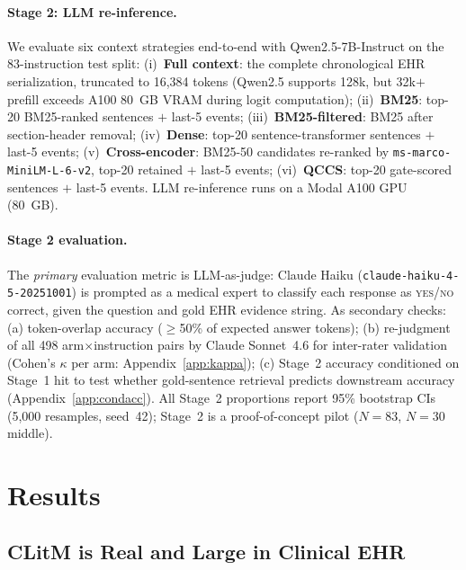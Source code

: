 \documentclass{article}
\begin{document}
\paragraph{Stage 2: LLM re-inference.} We evaluate six context strategies
end-to-end with Qwen2.5-7B-Instruct on the 83-instruction test split:
(i)~\textbf{Full context}: the complete chronological EHR serialization, truncated to
16,384 tokens (Qwen2.5 supports 128k, but 32k$+$ prefill exceeds A100 80~GB
VRAM during logit computation); (ii)~\textbf{BM25}: top-20 BM25-ranked
sentences $+$ last-5 events; (iii)~\textbf{BM25-filtered}: BM25 after
section-header removal; (iv)~\textbf{Dense}: top-20 sentence-transformer
sentences $+$ last-5 events; (v)~\textbf{Cross-encoder}: BM25-50 candidates
re-ranked by \texttt{ms-marco-MiniLM-L-6-v2}, top-20 retained $+$ last-5 events;
(vi)~\textbf{QCCS}: top-20 gate-scored sentences $+$ last-5 events.
LLM re-inference runs on a Modal A100 GPU (80~GB).

\paragraph{Stage 2 evaluation.} The \emph{primary} evaluation metric is
LLM-as-judge: Claude Haiku (\texttt{claude-haiku-4-5-20251001}) is prompted
as a medical expert to classify each response as \textsc{yes}/\textsc{no}
correct, given the question and gold EHR evidence string. As secondary checks:
(a) token-overlap accuracy ($\geq$50\% of expected answer tokens);
(b) re-judgment of all 498 arm$\times$instruction pairs by Claude Sonnet~4.6
for inter-rater validation (Cohen's $\kappa$ per arm: Appendix~\ref{app:kappa});
(c) Stage~2 accuracy conditioned on Stage~1 hit to test whether gold-sentence
retrieval predicts downstream accuracy (Appendix~\ref{app:condacc}).
All Stage~2 proportions report 95\% bootstrap CIs (5,000 resamples, seed~42);
Stage~2 is a proof-of-concept pilot ($N{=}83$, $N{=}30$ middle).

\section{Results}
\label{sec:results}

\subsection{CLitM is Real and Large in Clinical EHR}
\end{document}
